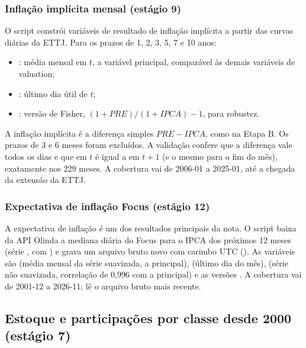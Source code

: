 \documentclass[12pt,a4paper]{article}
\begin{document}
\subsubsection{Inflação implícita mensal (estágio 9)}\label{sec:bei}

O script  constrói variáveis de resultado de
inflação implícita a partir das curvas diárias da ETTJ. Para os prazos de 1, 2, 3, 5, 7 e 10
anos:
\begin{itemize}[leftmargin=1.2cm]
    \item {}: média mensal em \(t\), a variável principal, comparável
    às demais variáveis de valuation;
    \item {}: último dia útil de \(t\);
    \item {}: versão de Fisher, \((1+PRE)/(1+IPCA)-1\), para
    robustez.
\end{itemize}
A inflação implícita é a diferença simples \(PRE - IPCA\), como na Etapa B. Os prazos
de 3 e 6 meses foram excluídos. A validação confere que a diferença vale todos os
dias e que  em \(t\) é igual a  em \(t+1\) (e
o mesmo para o fim do mês), exatamente nos 229 meses. A cobertura vai de 2006-01 a
2025-01, até a chegada da extensão da ETTJ.

\subsubsection{Expectativa de inflação Focus (estágio 12)}\label{sec:focus_ipca}

\begin{sloppypar}
A expectativa de inflação é um dos resultados principais da nota. O script  baixa da API Olinda a
mediana diária do Focus para o IPCA dos próximos 12 meses
(série , com ) e grava um
arquivo bruto novo com carimbo UTC (). As
variáveis são  (média mensal da série suavizada, a principal),
 (último dia do mês),
 (série não suavizada, correlação de 0,996 com a principal) e as versões
. A cobertura vai de 2001-12 a 2026-11;  lê o arquivo
bruto mais recente.
\end{sloppypar}

\subsection{Estoque e participações por classe desde 2000 (estágio 7)}\label{sec:estoque}
\end{document}
